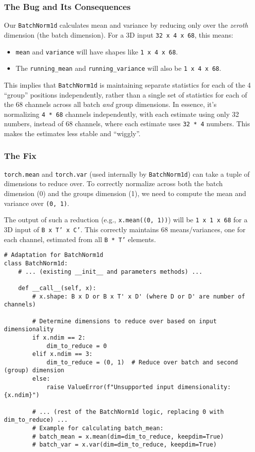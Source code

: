 \subsubsection{The Bug and Its Consequences}
Our \texttt{BatchNorm1d} calculates mean and variance by reducing only over the \textit{zeroth} dimension (the batch dimension). For a 3D input \texttt{32 x 4 x 68}, this means:
\begin{itemize}
    \item \texttt{mean} and \texttt{variance} will have shapes like \texttt{1 x 4 x 68}.
    \item The \texttt{running\_mean} and \texttt{running\_variance} will also be \texttt{1 x 4 x 68}.
\end{itemize}
This implies that \texttt{BatchNorm1d} is maintaining separate statistics for each of the 4 ``group'' positions independently, rather than a single set of statistics for each of the 68 channels across all batch \textit{and} group dimensions. In essence, it's normalizing \texttt{4 * 68} channels independently, with each estimate using only 32 numbers, instead of 68 channels, where each estimate uses \texttt{32 * 4} numbers. This makes the estimates less stable and ``wiggly''.

\subsubsection{The Fix}
\texttt{torch.mean} and \texttt{torch.var} (used internally by \texttt{BatchNorm1d}) can take a tuple of dimensions to reduce over. To correctly normalize across both the batch dimension (0) and the groups dimension (1), we need to compute the mean and variance over \texttt{(0, 1)}.

The output of such a reduction (e.g., \texttt{x.mean((0, 1))}) will be \texttt{1 x 1 x 68} for a 3D input of \texttt{B x T' x C'}. This correctly maintains 68 means/variances, one for each channel, estimated from all \texttt{B * T'} elements.

\begin{lstlisting}[caption={Adaptation for BatchNorm1d}]
# Adaptation for BatchNorm1d
class BatchNorm1d:
    # ... (existing __init__ and parameters methods) ...

    def __call__(self, x):
        # x.shape: B x D or B x T' x D' (where D or D' are number of channels)
        
        # Determine dimensions to reduce over based on input dimensionality
        if x.ndim == 2:
            dim_to_reduce = 0
        elif x.ndim == 3:
            dim_to_reduce = (0, 1)  # Reduce over batch and second (group) dimension
        else:
            raise ValueError(f"Unsupported input dimensionality: {x.ndim}")

        # ... (rest of the BatchNorm1d logic, replacing 0 with dim_to_reduce) ...
        # Example for calculating batch_mean:
        # batch_mean = x.mean(dim=dim_to_reduce, keepdim=True)
        # batch_var = x.var(dim=dim_to_reduce, keepdim=True)
\end{lstlisting}

